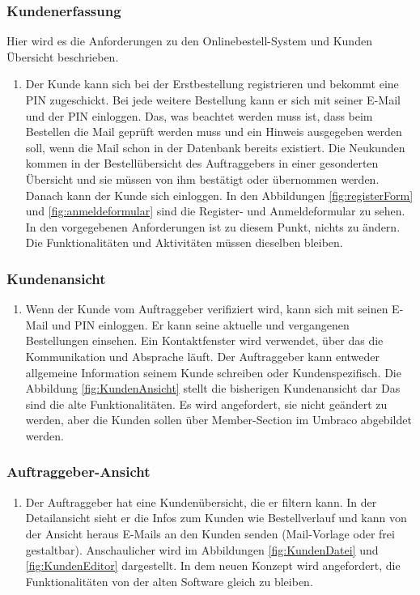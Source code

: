 \subsubsection{Kundenerfassung}
Hier wird es die Anforderungen zu den Onlinebestell-System und Kunden Übersicht beschrieben.
\begin{enumerate}
	\item Der Kunde kann sich bei der Erstbestellung registrieren und bekommt eine PIN zugeschickt. Bei jede weitere Bestellung kann er sich mit seiner E-Mail und der PIN einloggen. Das, was beachtet werden muss ist, dass beim Bestellen die Mail geprüft werden muss und ein Hinweis ausgegeben werden soll, wenn die Mail schon in der Datenbank bereits existiert. Die Neukunden kommen in der Bestellübersicht des Auftraggebers in einer gesonderten Übersicht und sie müssen von ihm bestätigt oder übernommen werden. Danach kann der Kunde sich einloggen.
	In den Abbildungen \ref{fig:registerForm} und \ref{fig:anmeldeformular} sind die Register- und Anmeldeformular zu sehen.
	In den vorgegebenen Anforderungen ist zu diesem Punkt, nichts zu ändern. Die Funktionalitäten und Aktivitäten müssen dieselben bleiben.
	
\end{enumerate} 

\subsubsection{Kundenansicht}

\begin{enumerate}
	\item Wenn der Kunde vom Auftraggeber verifiziert wird, kann sich mit seinen E-Mail und PIN einloggen. Er kann seine aktuelle und vergangenen Bestellungen einsehen. Ein Kontaktfenster wird verwendet, über das die Kommunikation und Absprache läuft. Der Auftraggeber kann entweder allgemeine Information seinem Kunde schreiben oder Kundenspezifisch. Die Abbildung \ref{fig:KundenAnsicht} stellt die bisherigen Kundenansicht dar 
	Das sind die alte Funktionalitäten. Es wird angefordert, sie nicht geändert zu werden, aber die Kunden sollen über Member-Section im Umbraco abgebildet werden.  
\end{enumerate} 

\subsubsection{Auftraggeber-Ansicht}

\begin{enumerate}
\item Der Auftraggeber hat eine Kundenübersicht, die er filtern kann. In der Detailansicht sieht er die Infos zum Kunden wie Bestellverlauf und kann von der Ansicht heraus E-Mails an den Kunden senden (Mail-Vorlage oder frei gestaltbar). Anschaulicher wird im Abbildungen \ref{fig:KundenDatei} und \ref{fig:KundenEditor} dargestellt.
In dem neuen Konzept wird angefordert, die Funktionalitäten von der alten Software gleich zu bleiben.
\end{enumerate} 

